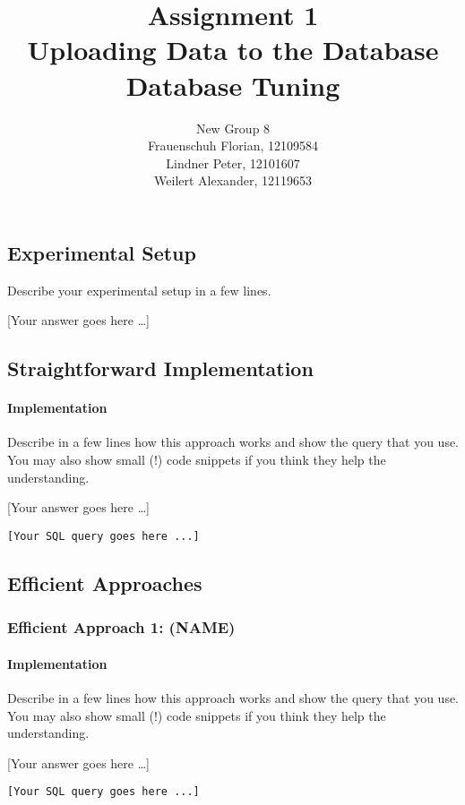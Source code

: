 \documentclass[11pt]{scrartcl}
\title{
  \textbf{\large Assignment 1} \\
  Uploading Data to the Database \\
  {\large Database Tuning}}
\author{
  New Group 8 \\
  \large Frauenschuh Florian, 12109584 \\
  \large Lindner Peter, 12101607 \\
  \large Weilert Alexander, 12119653
}
\newcommand{\youranswerhere}{[Your answer goes here \ldots]}
\begin{document}
\maketitle

\subsection*{Experimental Setup}

Describe your experimental setup in a few lines.

\youranswerhere{}

\subsection*{Straightforward Implementation}

\paragraph{Implementation}

Describe in a few lines how this approach works and show the query that you use. You may also show small (!) code snippets if you think they help the understanding.

\youranswerhere{}

\begin{lstlisting}[style=dbtsql]
[Your SQL query goes here ...]
\end{lstlisting}

\subsection*{Efficient Approaches}

\subsubsection*{Efficient Approach 1: (NAME)}

\paragraph{Implementation}

Describe in a few lines how this approach works and show the query that you use. You may also show small (!) code snippets if you think they help the understanding.

\youranswerhere{}

\begin{lstlisting}[style=dbtsql]
[Your SQL query goes here ...]
\end{lstlisting}
\end{document}
